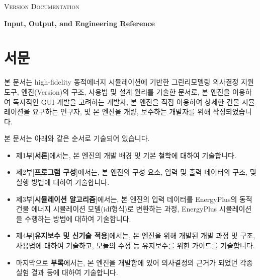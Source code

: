 \documentclass[oneside,openany,a4paper,12pt]{book}
\begin{document}
\pagestyle{plain} 


\listoftodos

\begin{titlepage}
  \centering
  {\scshape\large \simulator Version \releaseversion Documentation\par}
  \vspace{6em}
  {\bfseries\Huge Input, Output, and Engineering Reference\par}
  \vspace{1em}
  \vfill
  {\large \releasedate \par}
\end{titlepage}

\section*{서문}
본 문서는 high-fidelity 동적에너지 시뮬레이션에 기반한 그린리모델링 의사결정 지원 도구, \simulator 엔진(Version\releaseversion)의 구조, 사용법 및 설계 원리를 기술한 문서로, 본 엔진을 이용하여 독자적인 GUI 개발을 고려하는 개발자, 본 엔진을 직접 이용하여 상세한 건물 시뮬레이션을 요구하는 연구자, 및 본 엔진을 개량, 보수하는 개발자를 위해 작성되었습니다.

본 문서는 아래와 같은 순서로 기술되어 있습니다.
\begin{itemize}
  \item 제1부[{\bfseries 서론}]에서는, 본 엔진의 개발 배경 및 기본 철학에 대하여 기술합니다.
  \item 제2부[{\bfseries 프로그램 구성}]에서는, 본 엔진의 구성 요소, 입력 및 출력 데이터의 구조, 및 실행 방법에 대하여 기술합니다.
  \item 제3부[{\bfseries 시뮬레이션 알고리즘}]에서는, 본 엔진의 입력 데이터를 EnergyPlus의 동적 건물 에너지 시뮬레이션 모델(idf형식)로 변환하는 과정, EnergyPlus 시뮬레이션을 수행하는 방법에 대하여 기술합니다.
  \item 제4부[{\bfseries 유지보수 및 신기술 적용}]에서는, 본 엔진을 위해 개발된  개발 과정 및 구조, 사용법에 대하여 기술하고, 모듈의 수정 등 유지보수를 위한 가이드를 기술합니다.
  \item 마지막으로 {\bfseries 부록}에서는, 본 엔진을 개발함에 있어 의사결정의 근거가 되었던 각종 실험 결과 등에 대하여 기술합니다.
\end{itemize}
\end{document}
